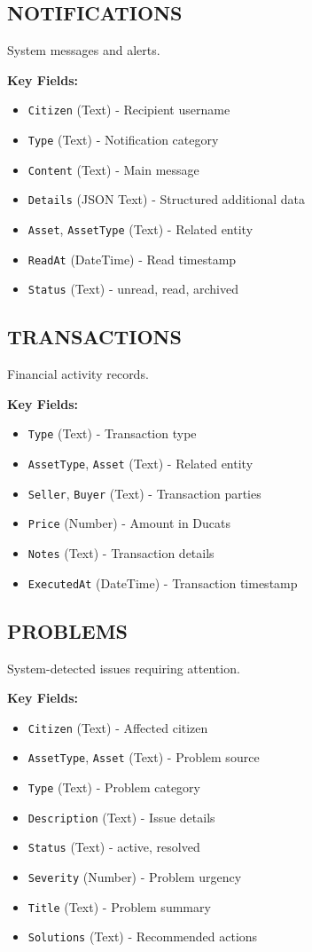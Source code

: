 \documentclass[11pt,a4paper]{article}
\begin{document}
\subsection{NOTIFICATIONS}

System messages and alerts.

\textbf{Key Fields:}
\begin{itemize}
\item \texttt{Citizen} (Text) - Recipient username
\item \texttt{Type} (Text) - Notification category
\item \texttt{Content} (Text) - Main message
\item \texttt{Details} (JSON Text) - Structured additional data
\item \texttt{Asset}, \texttt{AssetType} (Text) - Related entity
\item \texttt{ReadAt} (DateTime) - Read timestamp
\item \texttt{Status} (Text) - unread, read, archived
\end{itemize}

\subsection{TRANSACTIONS}

Financial activity records.

\textbf{Key Fields:}
\begin{itemize}
\item \texttt{Type} (Text) - Transaction type
\item \texttt{AssetType}, \texttt{Asset} (Text) - Related entity
\item \texttt{Seller}, \texttt{Buyer} (Text) - Transaction parties
\item \texttt{Price} (Number) - Amount in Ducats
\item \texttt{Notes} (Text) - Transaction details
\item \texttt{ExecutedAt} (DateTime) - Transaction timestamp
\end{itemize}

\subsection{PROBLEMS}

System-detected issues requiring attention.

\textbf{Key Fields:}
\begin{itemize}
\item \texttt{Citizen} (Text) - Affected citizen
\item \texttt{AssetType}, \texttt{Asset} (Text) - Problem source
\item \texttt{Type} (Text) - Problem category
\item \texttt{Description} (Text) - Issue details
\item \texttt{Status} (Text) - active, resolved
\item \texttt{Severity} (Number) - Problem urgency
\item \texttt{Title} (Text) - Problem summary
\item \texttt{Solutions} (Text) - Recommended actions
\end{itemize}
\end{document}
